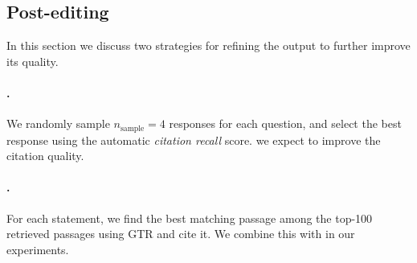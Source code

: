 \subsection{Post-editing}
\label{sec:refinement}

In this section we discuss two strategies for refining the  output to further improve its quality.

\paragraph{\textsc{\prerank{}}.}
We randomly sample $n_{\text{sample}}=4$ %
responses for each question, and select the best response using the automatic \textit{citation recall} score. 
we expect \textsc{\prerank{}} to improve the citation quality.

\paragraph{\textsc{\pposthoc{}}.}
For each statement, we find the best matching passage among the top-100 retrieved passages using GTR and cite it.
We combine this with \close{} in our experiments.

